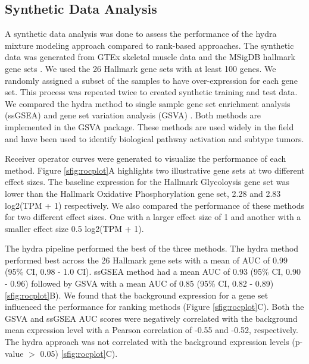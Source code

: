 \documentclass[fleqn,10pt]{wlscirep}
\begin{document}
\subsection*{Synthetic Data Analysis}
A synthetic data analysis was done to assess the performance of the hydra mixture modeling approach compared to rank-based approaches. The synthetic data was generated from GTEx skeletal muscle data and the MSigDB hallmark gene sets \cite{consortium2013genotype,liberzon2011molecular}. We used the 26 Hallmark gene sets with at least 100 genes. We randomly assigned a subset of the samples to have over-expression for each gene set. This process was repeated twice to created synthetic training and test data. We compared the hydra method to single sample gene set enrichment analysis (ssGSEA) \cite{barbie2009systematic} and gene set variation analysis (GSVA) \cite{hanzelmann2013gsva}. Both methods are implemented in the GSVA package. These methods are used widely in the field and have been used to identify biological pathway activation and subtype tumors.

Receiver operator curves were generated to visualize the performance of each method. Figure \ref{sfig:rocplot}A highlights two illustrative gene sets at two different effect sizes. The baseline expression for the Hallmark Glycoloysis gene set was lower than the Hallmark Oxidative Phosphorylation gene set, 2.28 and 2.83 log2(TPM + 1) respectively. We also compared the performance of these methods for two different effect sizes. One with a larger effect size of 1 and another with a smaller effect size 0.5 log2(TPM + 1).  

The hydra pipeline performed the best of the three methods. The hydra method performed best across the 26 Hallmark gene sets with a mean of AUC of 0.99 (95\% CI, 0.98 - 1.0 CI). ssGSEA method had a mean AUC of 0.93 (95\% CI, 0.90 - 0.96) followed by GSVA with a mean AUC of 0.85 (95\% CI, 0.82 - 0.89) \ref{sfig:rocplot}B). We found that the background expression for a gene set influenced the performance for ranking methods (Figure \ref{sfig:rocplot}C). Both the GSVA and ssGSEA AUC scores were negatively correlated with the background mean expression level with a Pearson correlation of -0.55 and -0.52, respectively. The hydra approach was not correlated with the background expression levels (p-value $>$ 0.05) \ref{sfig:rocplot}C).


\end{document}
